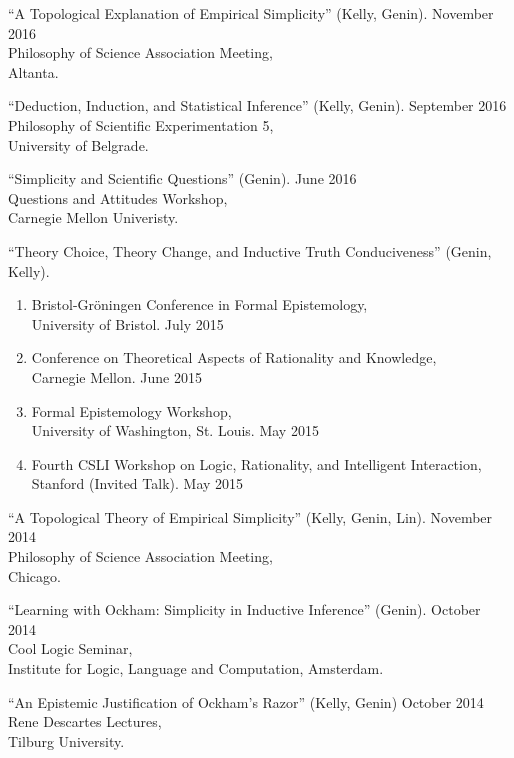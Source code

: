 \documentclass[12pt]{res} %
\begin{document}
\begin{resume}
``A Topological Explanation of Empirical Simplicity'' (Kelly, Genin). \hfill November 2016\\
Philosophy of Science Association Meeting, \\
Altanta.

``Deduction, Induction, and Statistical Inference'' (Kelly, Genin). \hfill September 2016\\
Philosophy of Scientific Experimentation 5,\\
University of Belgrade.

``Simplicity and Scientific Questions'' (Genin). \hfill June 2016\\ 
Questions and Attitudes Workshop,\\
Carnegie Mellon Univeristy.

``Theory Choice, Theory Change, and Inductive Truth Conduciveness'' (Genin, Kelly).\\
\begin{enumerate}
\item Bristol-Gr\"{o}ningen Conference in Formal Epistemology,\\University of Bristol. \hfill July 2015
\item Conference on Theoretical Aspects of Rationality and Knowledge,\\ Carnegie Mellon. \hfill June 2015
\item Formal Epistemology Workshop,\\ University of Washington, St. Louis. \hfill May 2015
\item Fourth CSLI Workshop on Logic, Rationality, and Intelligent Interaction,\\ Stanford (Invited Talk). \hfill May 2015
\end{enumerate}

``A Topological Theory of Empirical Simplicity'' (Kelly, Genin, Lin). \hfill November 2014\\
Philosophy of Science Association Meeting,\\
Chicago.

``Learning with Ockham: Simplicity in Inductive Inference'' (Genin). \hfill October 2014\\
Cool Logic Seminar,\\ 
Institute for Logic, Language and Computation, Amsterdam.

``An Epistemic Justification of Ockham's Razor'' (Kelly, Genin) \hfill October 2014\\Rene Descartes Lectures,\\
Tilburg University.


\end{resume}
\end{document}
